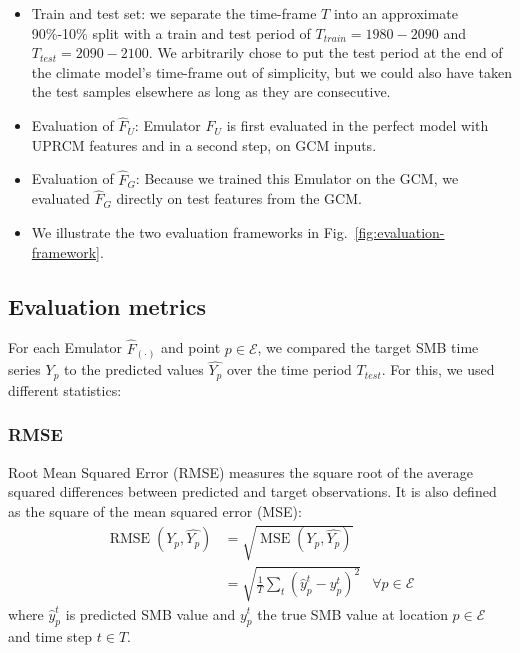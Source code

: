 \documentclass[a4paper,11pt,oneside]{report}
\begin{document}
\begin{itemize}
    \item Train and test set: we separate the time-frame $T$ into an approximate 90\%-10\% split with a train and test period of $T_{train} = 1980-2090$ and $T_{test} = 2090-2100$. We arbitrarily chose to put the test period at the end of the climate model's time-frame out of simplicity, but we could also have taken the test samples elsewhere as long as they are consecutive.    
    \item Evaluation of $\hat{F}_U$: Emulator $\hat{F}_U$ is first evaluated in the perfect model with UPRCM features and in a second step, on GCM inputs. 
    \item Evaluation of $\hat{F}_G$: Because we trained this Emulator on the GCM, we evaluated $\hat{F}_G$ directly on test features from the GCM. 
    \item We illustrate the two evaluation frameworks in Fig.~\ref{fig:evaluation-framework}.
    
\end{itemize}

\subsection{Evaluation metrics}\label{subsec:evaluation-metrics}
For each Emulator $\hat{F}_{(\cdot)}$ and point $p \in \mathcal{E}$, we compared the target SMB time series $Y_{p}$ to the predicted values $\widehat{Y_{p}}$ over the time period $T_{test}$. For this, we used different statistics:

\subsubsection{RMSE}\label{subsubsec:rmse}
Root Mean Squared Error (RMSE) measures the square root of the average squared differences between predicted and target observations. It is also defined as the square of the mean squared error (MSE):
\begin{align}\label{eq:RMSE}
        \operatorname{RMSE}\left(Y_{p},\widehat{Y_{p}}\right) & = \sqrt{\operatorname{MSE}\left(Y_{p},\widehat{Y_{p}}\right)} \\ & = \sqrt{\frac{1}{T}\sum_{t}(\hat{y}_{p}^{t}-y^{t}_{p})^2} & \forall p \in \mathcal{E} 
\end{align}
where $\hat{y}_{p}^{t}$ is predicted SMB value and $y^{t}_{p}$ the true SMB value at location $p\in \mathcal{E} $ and time step $t\in T$. 
\end{document}
